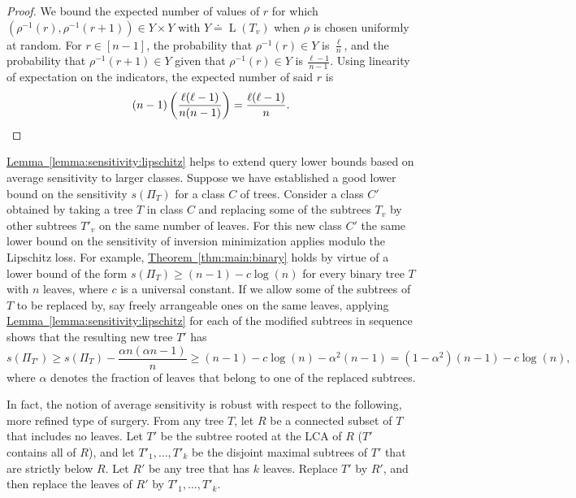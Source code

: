 \documentclass[11pt]{article}
\numberwithin{equation}{section}
\theoremstyle{definition}
\theoremstyle{plain}
\newcommand{\expref}[2]{\hyperref[#2]{#1~\ref{#2}}}
\DeclareMathOperator{\leafset}{L}
\newcommand{\ranking}{\rho}
\begin{document}
\begin{proof}
We bound the expected number of values of $r$ for which $(\ranking^{-1}(r),\ranking^{-1}(r+1)) \in Y \times Y$ with $Y \doteq \leafset(T_v)$ when $\ranking$ is chosen uniformly at random. For $r \in [n-1]$, the probability that $\ranking^{-1}(r) \in Y$ is $\frac{\ell}{n}$, and the probability that $\ranking^{-1}(r+1)\in Y$ given that $\ranking^{-1}(r)\in Y$ is $\frac{\ell-1}{n-1}$. Using linearity of expectation on the indicators, the expected number of said $r$ is 
    \begin{equation*}
        (n-1)\left(\frac{\ell(\ell-1)}{n(n-1)}\right) = \frac{\ell(\ell-1)}{n}. \qedhere
    \end{equation*}
\end{proof}

\expref{Lemma}{lemma:sensitivity:lipschitz} helps to extend query lower bounds based on average sensitivity to larger classes. Suppose we have established a good lower bound on the sensitivity $s(\Pi_T)$ for a class $C$ of trees. Consider a class $C'$ obtained by taking a tree $T$ in class $C$ and replacing some of the subtrees $T_v$ by other subtrees $T'_v$ on the same number of leaves. For this new class $C'$ the same lower bound on the sensitivity of inversion minimization applies modulo the Lipschitz loss. For example, \expref{Theorem}{thm:main:binary} holds by virtue of a lower bound of the form $s(\Pi_T) \ge (n-1) - c \log(n)$ for every binary tree $T$ with $n$ leaves, where $c$ is a universal constant. If we allow some of the subtrees of $T$ to be replaced by, say freely arrangeable ones on the same leaves, applying \expref{Lemma}{lemma:sensitivity:lipschitz} for each of the modified subtrees in sequence shows that the resulting new tree $T'$ has 
\[ s(\Pi_{T'}) \ge s(\Pi_T) - \frac{\alpha n (\alpha n - 1)}{n} 
\ge (n-1) - c \log(n) - \alpha^2 (n-1) = (1-\alpha^2)(n-1) - c \log(n), \]
where $\alpha$ denotes the fraction of leaves that belong to one of the replaced subtrees.

In fact, the notion of average sensitivity is robust with respect to the following, more refined type of surgery. From any tree $T$, let $R$ be a connected subset of $T$ that includes no leaves. Let $T'$ be the subtree rooted at the LCA of $R$ ($T'$ contains all of $R$), and let $T'_1, \dots, T'_k$ be the disjoint maximal subtrees of $T'$ that are strictly below $R$. Let $R'$ be any tree that has $k$ leaves. Replace $T'$ by $R'$, and then replace the leaves of $R'$ by $T'_1, \dots, T'_k$.
\end{document}
